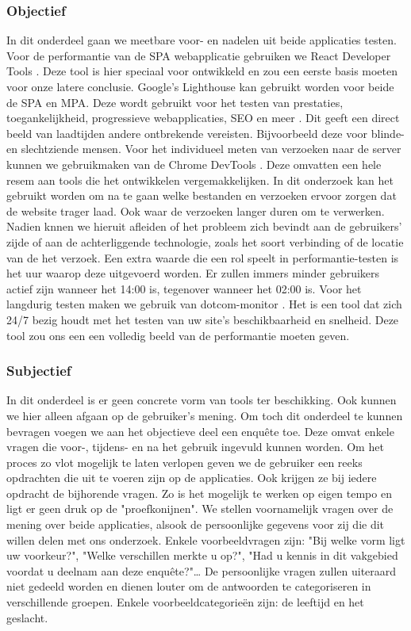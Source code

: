 \documentclass{hogent-article}
\begin{document}
\subsubsection{Objectief}
In dit onderdeel gaan we meetbare voor- en nadelen uit beide applicaties testen.
Voor de performantie van de SPA webapplicatie gebruiken we React Developer Tools \autocite{RDT2022}.
Deze tool is hier speciaal voor ontwikkeld en zou een eerste basis moeten voor onze latere conclusie.
Google's Lighthouse kan gebruikt worden voor beide de SPA en MPA.
Deze wordt gebruikt voor het testen van prestaties, toegankelijkheid, progressieve webapplicaties, SEO en meer \autocite{GoogleLighthouse2022}.
Dit geeft een direct beeld van laadtijden andere ontbrekende vereisten.
Bijvoorbeeld deze voor blinde- en slechtziende mensen.
Voor het individueel meten van verzoeken naar de server kunnen we gebruikmaken van de Chrome DevTools \autocite{GoogleDevTools2016}.
Deze omvatten een hele resem aan tools die het ontwikkelen vergemakkelijken.
In dit onderzoek kan het gebruikt worden om na te gaan welke bestanden en verzoeken ervoor zorgen dat de website trager laad.
Ook waar de verzoeken langer duren om te verwerken.
Nadien knnen we hieruit afleiden of het probleem zich bevindt aan de gebruikers' zijde of aan de achterliggende technologie, zoals het soort verbinding of de locatie van de het verzoek.
Een extra waarde die een rol speelt in performantie-testen is het uur waarop deze uitgevoerd worden.
Er zullen immers minder gebruikers actief zijn wanneer het 14:00 is, tegenover wanneer het 02:00 is.
Voor het langdurig testen maken we gebruik van dotcom-monitor \autocite{dotcom-monitor2022}.
Het is een tool dat zich 24/7 bezig houdt met het testen van uw site's beschikbaarheid en snelheid.
Deze tool zou ons een een volledig beeld van de performantie moeten geven.

\subsubsection{Subjectief}
In dit onderdeel is er geen concrete vorm van tools ter beschikking.
Ook kunnen we hier alleen afgaan op de gebruiker's mening.
Om toch dit onderdeel te kunnen bevragen voegen we aan het objectieve deel een enquête toe.
Deze omvat enkele vragen die voor-, tijdens- en na het gebruik ingevuld kunnen worden.
Om het proces zo vlot mogelijk te laten verlopen geven we de gebruiker een reeks opdrachten die uit te voeren zijn op de applicaties.
Ook krijgen ze bij iedere opdracht de bijhorende vragen.
Zo is het mogelijk te werken op eigen tempo en ligt er geen druk op de "proefkonijnen".
We stellen voornamelijk vragen over de mening over beide applicaties, alsook de persoonlijke gegevens voor zij die dit willen delen met ons onderzoek.
Enkele voorbeeldvragen zijn:
"Bij welke vorm ligt uw voorkeur?",
"Welke verschillen merkte u op?",
"Had u kennis in dit vakgebied voordat u deelnam aan deze enquête?"\dots
De persoonlijke vragen zullen uiteraard niet gedeeld worden en dienen louter om de antwoorden te categoriseren in verschillende groepen.
Enkele voorbeeldcategorieën zijn: de leeftijd en het geslacht.
\end{document}
